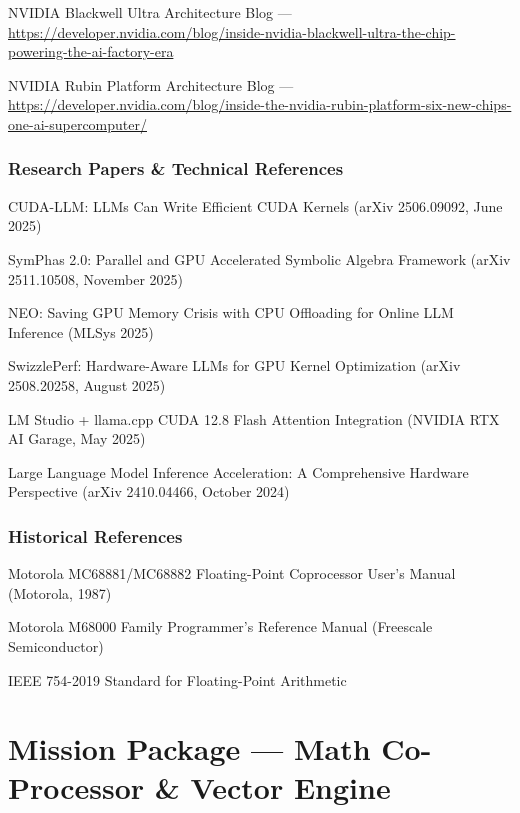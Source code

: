 \documentclass[11pt,letterpaper]{article}
\newcommand{\stageheader}[2]{%
  \noindent\colorbox{#2}{\makebox[\textwidth][l]{%
    \textcolor{white}{\bfseries\sffamily\hspace{6pt}#1\hspace{6pt}}}}%
  \vspace{0.5em}\par%
}
\begin{document}
NVIDIA Blackwell Ultra Architecture Blog --- \url{https://developer.nvidia.com/blog/inside-nvidia-blackwell-ultra-the-chip-powering-the-ai-factory-era}

NVIDIA Rubin Platform Architecture Blog --- \url{https://developer.nvidia.com/blog/inside-the-nvidia-rubin-platform-six-new-chips-one-ai-supercomputer/}

\subsubsection{Research Papers \& Technical References}

CUDA-LLM: LLMs Can Write Efficient CUDA Kernels (arXiv 2506.09092, June 2025)

SymPhas 2.0: Parallel and GPU Accelerated Symbolic Algebra Framework (arXiv 2511.10508, November 2025)

NEO: Saving GPU Memory Crisis with CPU Offloading for Online LLM Inference (MLSys 2025)

SwizzlePerf: Hardware-Aware LLMs for GPU Kernel Optimization (arXiv 2508.20258, August 2025)

LM Studio + llama.cpp CUDA 12.8 Flash Attention Integration (NVIDIA RTX AI Garage, May 2025)

Large Language Model Inference Acceleration: A Comprehensive Hardware Perspective (arXiv 2410.04466, October 2024)

\subsubsection{Historical References}

Motorola MC68881/MC68882 Floating-Point Coprocessor User's Manual (Motorola, 1987)

Motorola M68000 Family Programmer's Reference Manual (Freescale Semiconductor)

IEEE 754-2019 Standard for Floating-Point Arithmetic

\newpage

\stageheader{STAGE 3 --- MISSION PACKAGE}{tertiary}

\section{Mission Package --- Math Co-Processor \& Vector Engine}
\end{document}
